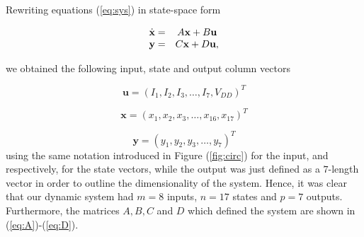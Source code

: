 \documentclass[10pt,a4paper]{article}
\begin{document}
Rewriting equations (\ref{eq:sys}) in state-space form

\begin{eqnarray}
\begin{array}{c c}
\dot{\textbf{x}} = & A \textbf{x} + B \textbf{u}\\
\textbf{y} = & C\textbf{x} +  D\textbf{u},\nonumber
\end{array}
\end{eqnarray}

we obtained the following input, state and output column vectors

\begin{equation}
\textbf{u} = \left(I_1, I_2, I_3, \dots, I_7, V_{DD}\right)^T\nonumber
\end{equation}

\begin{equation}
\textbf{x} = \left(x_1, x_2, x_3, \dots, x_{16}, x_{17}\right)^T\nonumber
\end{equation}

\begin{equation}
\textbf{y} = \left(y_1, y_2, y_3, \dots, y_{7}\right)^T\nonumber
\end{equation}
using the same notation introduced in Figure (\ref{fig:circ}) for the input, and respectively, for the state vectors, while the output was just defined as a $7$-length vector in order to outline the dimensionality of the system. Hence, it was clear that our dynamic system had $m = 8$ inputs, $n = 17$ states and $p = 7$ outputs. Furthermore, the matrices $A, B, C$ and $D $ which defined the system are shown in (\ref{eq:A})-(\ref{eq:D}). 
\end{document}
